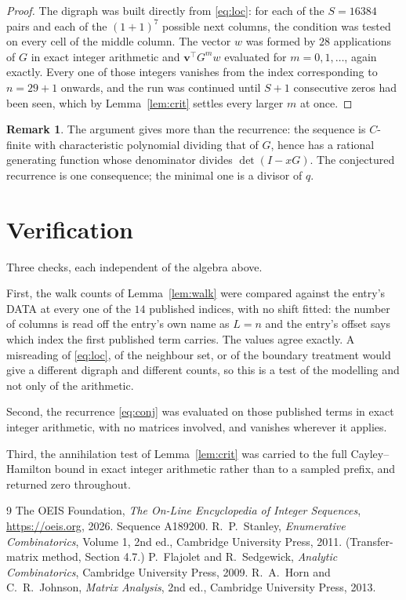 \documentclass[11pt,a4paper]{article}
\theoremstyle{plain}
\theoremstyle{definition}
\newtheorem{remark}[theorem]{Remark}
\begin{document}
\begin{proof}
The digraph was built directly from \eqref{eq:loc}: for each of the $S=16384$ pairs and each
of the $(1+1)^{7}$ possible next columns, the condition was tested on every cell of
the middle column. The vector $w$ was formed by $28$ applications of $G$ in exact integer
arithmetic and $\mathbf{v}^{\!\top}G^{m}w$ evaluated for $m=0,1,\dots$, again exactly.
Every one of those integers vanishes from the index corresponding to $n=29+1$ onwards,
and the run was continued until $S+1$ consecutive zeros had been seen, which by
Lemma~\ref{lem:crit} settles every larger $m$ at once.
\end{proof}

\begin{remark}
The argument gives more than the recurrence: the sequence is $C$-finite with characteristic
polynomial dividing that of $G$, hence has a rational generating function whose denominator
divides $\det(I-xG)$. The conjectured recurrence is one consequence; the minimal one is a
divisor of $q$.
\end{remark}

\section{Verification}

Three checks, each independent of the algebra above.

First, the walk counts of Lemma~\ref{lem:walk} were compared against the entry's DATA at
every one of the $14$ published indices, with no shift fitted: the number of columns is
read off the entry's own name as $L=n$ and the entry's offset says which index the first
published term carries. The values agree exactly. A misreading of \eqref{eq:loc}, of the
neighbour set, or of the boundary treatment would give a different digraph and different
counts, so this is a test of the modelling and not only of the arithmetic.

Second, the recurrence \eqref{eq:conj} was evaluated on those published terms in exact
integer arithmetic, with no matrices involved, and vanishes wherever it applies.

Third, the annihilation test of Lemma~\ref{lem:crit} was carried to the full
Cayley--Hamilton bound in exact integer arithmetic rather than to a sampled prefix, and
returned zero throughout.

\begin{thebibliography}{9}
 The OEIS Foundation, \emph{The On-Line Encyclopedia of Integer
Sequences}, \url{https://oeis.org}, 2026. Sequence A189200.
 R.~P.~Stanley, \emph{Enumerative Combinatorics}, Volume 1, 2nd ed.,
Cambridge University Press, 2011. (Transfer-matrix method, Section 4.7.)
 P.~Flajolet and R.~Sedgewick, \emph{Analytic Combinatorics}, Cambridge
University Press, 2009.
 R.~A.~Horn and C.~R.~Johnson, \emph{Matrix Analysis}, 2nd ed., Cambridge
University Press, 2013.
\end{thebibliography}
\end{document}
